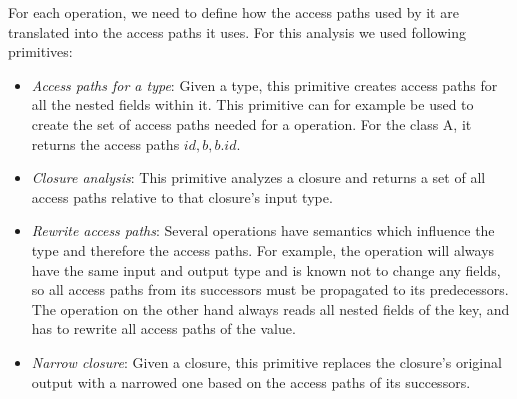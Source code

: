 For each operation, we need to define how the access paths used by it are
translated into the access paths it uses. For this analysis we used following
primitives:
\begin{itemize}
\item \emph{Access paths for a type}: Given a type, this primitive creates
access paths for all the nested fields within it. This primitive can for example
be used to create the set of access paths needed for a  operation.
For the class A, it returns the access paths ${id, b, b.id}$.
\item \emph{Closure analysis}: This primitive analyzes a closure and returns a
set of all access paths relative to that closure's input type.
\item \emph{Rewrite access paths}: Several operations have semantics which
influence the type and therefore the access paths. For example, the 
operation will always have the same input and output type and is known not to
change any fields, so all access paths from its successors must be propagated to
its predecessors. The  operation on the other hand always reads
all nested fields of the key, and has to rewrite all access paths of the value.
\item \emph{Narrow closure}: Given a closure, this primitive replaces the
closure's original output with a narrowed one based on the access paths of its
successors.
\end{itemize}

